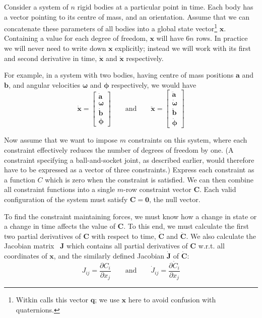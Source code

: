 Consider a system of $n$ rigid bodies at a particular point in time. Each body has a vector
pointing to its centre of mass, and an orientation. Assume that we can concatenate these
parameters of all bodies into a global state vector\footnote{Witkin calls this vector
$\mathbf{q}$; we use $\mathbf{x}$ here to avoid confusion with quaternions.} $\mathbf{x}$.
Containing a value for each degree of freedom, $\mathbf{x}$ will have $6n$ rows. In practice
we will never need to write down $\mathbf{x}$ explicitly; instead we will work with its
first and second derivative in time, $\dot{\mathbf{x}}$ and $\ddot{\mathbf{x}}$ respectively.

For example, in a system with two bodies, having centre of mass positions $\mathbf{a}$ and
$\mathbf{b}$, and angular velocities $\bm{\omega}$ and $\bm{\phi}$ respectively, we would
have
\begin{equation}
\label{lagrangeStateVector}
\dot{\mathbf{x}} = \left[ \begin{array}{c}
    \dot{\mathbf{a}}\\ \bm{\omega}\\ \dot{\mathbf{b}}\\ \bm{\phi} \end{array}\right]
\quad\quad\mathrm{and}\quad\quad
\ddot{\mathbf{x}} = \left[ \begin{array}{c}
    \ddot{\mathbf{a}}\\ \dot{\bm{\omega}}\\ \ddot{\mathbf{b}}\\ \dot{\bm{\phi}} \end{array}\right]
\end{equation}

Now assume that we want to impose $m$ constraints on this system, where each constraint
effectively reduces the number of degrees of freedom by one. (A constraint specifying a
ball-and-socket joint, as described earlier, would therefore have to be expressed as a
vector of three constraints.) Express each constraint as a function $C$ which is zero
when the constraint is satisfied. We can then combine all constraint functions into a
single $m$-row constraint vector $\mathbf{C}$. Each valid configuration of the system must
satisfy $\mathbf{C} = \mathbf{0}$, the null vector.

To find the constraint maintaining forces, we must know how a change in state or a change in
time affects the value of $\mathbf{C}$. To this end, we must calculate the first two partial
derivatives of $\mathbf{C}$ with respect to time, $\dot{\mathbf{C}}$ and $\ddot{\mathbf{C}}$.
We also calculate the Jacobian matrix~\cite{RHB:02} $\mathbf{J}$ which contains all partial
derivatives of $\mathbf{C}$ w.r.t. all coordinates of $\mathbf{x}$, and the similarly
defined Jacobian $\dot{\mathbf{J}}$ of $\dot{\mathbf{C}}$:
\begin{equation}
J_{ij} = \frac{\partial C_i}{\partial x_j} \quad\quad\mathrm{and}\quad\quad
\dot{J}_{ij} = \frac{\partial \dot{C}_i}{\partial x_j}
\end{equation}

